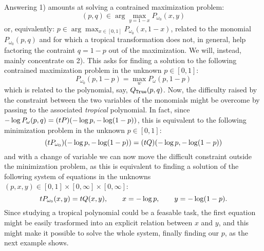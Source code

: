 Answering 1) amounts at solving a contrained maximization problem:
\[(p,q)\in\arg\max_{y=1-x} P_{\omega_{0}}(x,y)\] or, equivalently: $p\in\arg\max_{x\in[0,1]} P_{\omega_0}(x,1-x)$,
related to the monomial $P_{\omega_{0}}(p,q)$ and for which a tropical transformation does not, in general, help factoring the contraint $q=1-p$ out of the maximization.
We will, instead, mainly concentrate on 2).
This asks for finding a solution to the following contrained maximization problem in the unknown $p\in[0,1]$:
\[
P_{\omega_0}(p,1-p) = \max_w P_{\omega}(p,1-p)
\]
which is related to the polynomial, say, $Q_{\mathtt{True}}(p,q)$.
Now, the difficulty raised by the constraint between the two variables of the monomials might be overcome by passing to the associated \emph{tropical} polynomial.
In fact, since $-\log P_\omega(p,q)=(\trop P)(-\log p,-\log(1-p))$, this is equivalent to the following minimization problem in the unknown $p\in[0,1]$:
\[
(\trop P_{\omega_0})(-\log p,-\log(1-p)) = (\trop Q)(-\log p,-\log(1-p))
\]
and with a change of variable we can now move the difficult constraint outside the minimization problem, as this is equivalent to finding a solution of the following system of equations in the unknowns $(p,x,y)\in[0,1]\times[0,\infty]\times[0,\infty]$:
\[
\trop P_{\omega_0}(x,y) = \trop Q (x,y), \qquad x= -\log p,\qquad y=-\log(1-p).
\]
Since studying a tropical polynomial could be a feasable task, the first equation might be easily trasformed into an explicit relation between $x$ and $y$, and this might make it possible to solve the whole system, finally finding our $p$, as the next example shows.
